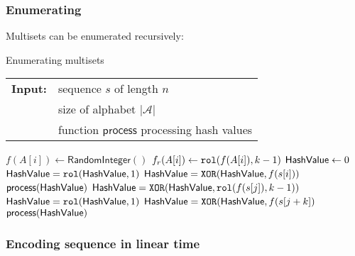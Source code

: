 \subsubsection{Enumerating}
Multisets can be enumerated recursively:
\begin{algorithm}[t]
\caption{Enumerating multisets}
\label{code:ntHash}
\begin{tabular}{@{}l@{~}l}
\textbf{Input:}&sequence $s$ of length $n$\\
               &size of alphabet $|\mathcal{A}|$\\
               &function \(\mathsf{process}\) processing hash values
\end{tabular}
\begin{algorithmic}
 
\State \(f(A[i]) \gets \mathsf{RandomInteger}()\)
\EndFor
{} 
\State \(f_r(A[i]) \gets \mathtt{rol}(f(A[i]),k-1)\)
\EndFor
\State \(\mathsf{HashValue} \gets 0\)
 
\State \(\mathsf{HashValue} = \mathtt{rol}(\mathsf{HashValue},1)\)
\State \(\mathsf{HashValue} = \mathtt{XOR}(\mathsf{HashValue},f(s[i]))\)
\EndFor
\State \(\mathsf{process}(\mathsf{HashValue})\)
 
\State \(\mathsf{HashValue} = \mathtt{XOR}(\mathsf{HashValue},\mathtt{rol}(f(s[j]),k-1))\)
\State \(\mathsf{HashValue} = \mathtt{rol}(\mathsf{HashValue},1)\)
\State \(\mathsf{HashValue} = \mathtt{XOR}(\mathsf{HashValue},f(s[j+k])\)
\State \(\mathsf{process}(\mathsf{HashValue})\)
\EndFor
\end{algorithmic}
\end{algorithm}



\subsubsection{Encoding sequence in linear time}